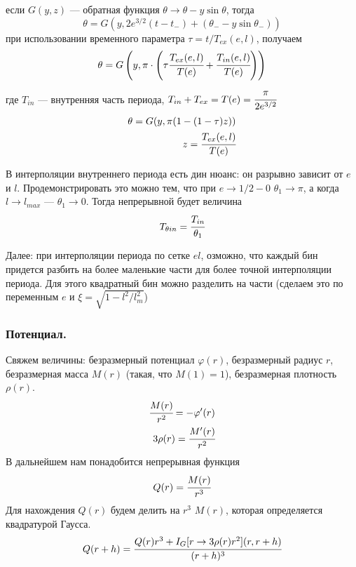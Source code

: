 \begin{enumerate}
\begin{itemize}
			если $G(y,z) $ --- обратная функция $\theta \rightarrow \theta - y \sin{\theta}$, тогда
			\begin{equation*}
				\theta = G(y,2e^{3/2}(t-t_{-}) + (\theta_{-} - y\sin{\theta_{-}})) 
			\end{equation*}
			при использовании временного параметра $\tau = t/T_{ex}(e,l)$, получаем
			\begin{equation*}
				\theta = G\left(y,\pi \cdot \left(\tau \cfrac{T_{ex}(e,l)}{T(e)} +
				\cfrac{T_{in}(e,l)}{T(e)}
				\right) \right) 
			\end{equation*}
			где $T_{in}$ --- внутренняя часть периода, $T_{in} + T_{ex} = T(e) = \cfrac{\pi}{2e^{3/2}}$
			\begin{eqnarray*}
				\theta = G(y,\pi (1 -(1 - \tau)z ) ) \\
				z = \cfrac{T_{ex}(e,l)}{T(e)}
			\end{eqnarray*}
			
		\end{itemize}
	\end{enumerate}
	
	В интерполяции внутреннего периода есть дин нюанс: он разрывно зависит от $e$ и $l$.
	Продемонстрировать это можно тем, что при $e \rightarrow 1/2-0$ $\theta_1 \rightarrow \pi$, а когда  $l \rightarrow l_{max}$ --- $\theta_1 \rightarrow 0$. Тогда непрерывной будет величина 
	\begin{equation}
		T_{\theta in} = \cfrac{T_{in}}{\theta_1}
	\end{equation}
	
	Далее: при интерполяции периода по сетке $el$, озможно, что каждый бин придется разбить на более маленькие части для более точной интерполяции периода. Для этого квадратный бин можно разделить на части (сделаем это по переменным $e$ и $\xi = \sqrt{1-l^2/l_m^2}$)
	
	
	\subsubsection{Потенциал.}
	Свяжем величины: безразмерный потенциал $\varphi(r)$, безразмерный радиус $r$, безразмерная масса $M(r)$ (такая, что $M(1) = 1$), безразмерная плотность $\rho(r)$.
	\begin{eqnarray*}
		\cfrac{M(r)}{r^2} = -\varphi'(r) \\
		3\rho(r) = \cfrac{M'(r)}{r^2}
	\end{eqnarray*}
	В дальнейшем нам понадобится непрерывная функция 
	\begin{equation}
		Q(r) = \cfrac{M(r)}{r^3}
	\end{equation}	
	Для нахождения $Q(r)$ будем делить на $r^3$ $M(r)$, которая определяется квадратурой Гаусса.
	\begin{equation}
		Q(r+h) = \cfrac{Q(r)r^3 + I_G[r \rightarrow  3\rho(r)r^2](r,r+h)}{(r+h)^3}
	\end{equation}
	
